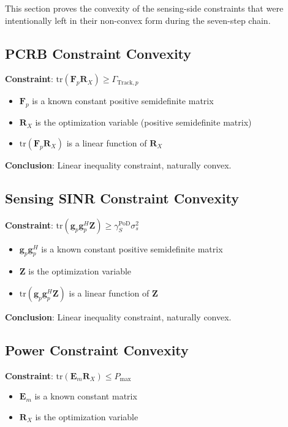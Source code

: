\documentclass[12pt,a4paper]{article}
\newcommand{\vect}[1]{\mathbf{#1}}
\newcommand{\mat}[1]{\mathbf{#1}}
\newcommand{\tr}{\text{tr}}
\begin{document}
This section proves the convexity of the sensing-side constraints that were intentionally left in their non-convex form during the seven-step chain.

\subsection{PCRB Constraint Convexity}

\textbf{Constraint}: $\tr(\mat{F}_p \mat{R}_X) \geq \Gamma_{\text{Track},p}$

\begin{itemize}
    \item $\mat{F}_p$ is a known constant positive semidefinite matrix
    \item $\mat{R}_X$ is the optimization variable (positive semidefinite matrix)
    \item $\tr(\mat{F}_p \mat{R}_X)$ is a linear function of $\mat{R}_X$
\end{itemize}

\textbf{Conclusion}: Linear inequality constraint, naturally convex.

\subsection{Sensing SINR Constraint Convexity}

\textbf{Constraint}: $\tr(\vect{g}_p \vect{g}_p^H \mat{Z}) \geq \gamma_S^{\text{PoD}} \sigma_s^2$

\begin{itemize}
    \item $\vect{g}_p \vect{g}_p^H$ is a known constant positive semidefinite matrix
    \item $\mat{Z}$ is the optimization variable
    \item $\tr(\vect{g}_p \vect{g}_p^H \mat{Z})$ is a linear function of $\mat{Z}$
\end{itemize}

\textbf{Conclusion}: Linear inequality constraint, naturally convex.

\subsection{Power Constraint Convexity}

\textbf{Constraint}: $\tr(\mat{E}_m \mat{R}_X) \leq P_{\max}$

\begin{itemize}
    \item $\mat{E}_m$ is a known constant matrix
    \item $\mat{R}_X$ is the optimization variable
\end{itemize}
\end{document}
